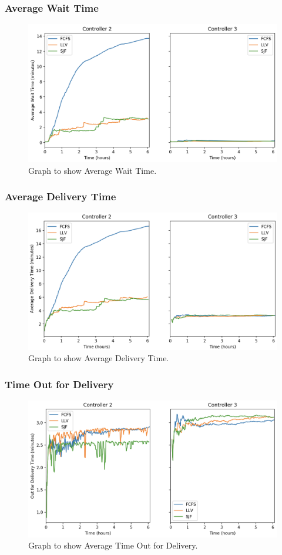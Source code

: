 \documentclass[a4paper,11pt,titlepage]{report}
\begin{document}
\subsubsection{Average Wait Time}
\begin{figure}[!hbpt]
  \center
  \includegraphics[width=0.5\linewidth]{img/small/avgwaittime.png}
  \caption{Graph to show Average Wait Time.}
  \label{fig:small_avgwaittime}
\end{figure}

\subsubsection{Average Delivery Time}
\begin{figure}[!hbpt]
  \center
  \includegraphics[width=0.5\linewidth]{img/small/avgdeltime.png}
  \caption{Graph to show Average Delivery Time.}
  \label{fig:small_avgdeltime}
\end{figure}

\subsubsection{Time Out for Delivery}
\begin{figure}[!hbpt]
  \center
  \includegraphics[width=0.5\linewidth]{img/small/deltime.png}
  \caption{Graph to show Average Time Out for Delivery.}
  \label{fig:small_deltime}
\end{figure}
\end{document}
